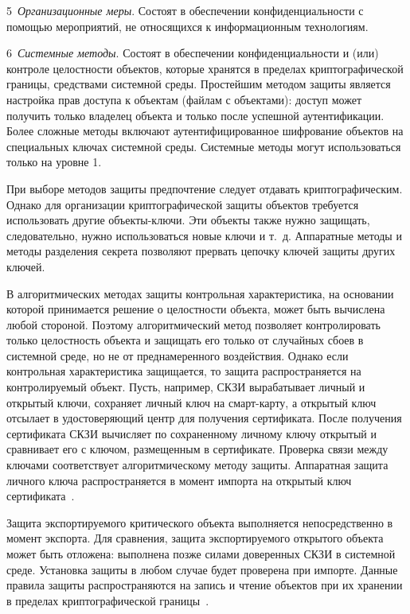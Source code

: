 5~{\it Организационные меры}. 
Состоят в обеспечении конфиденциальности с помощью мероприятий,
не относящихся к информационным технологиям.

6~{\it Системные методы}. 
Состоят в обеспечении конфиденциальности и (или) контроле целостности объектов, 
которые хранятся в пределах криптографической границы, средствами системной 
среды. Простейшим методом защиты является настройка прав доступа к объектам 
(файлам с объектами): доступ может получить только владелец объекта и только 
после успешной аутентификации. Более сложные методы включают 
аутентифицированное шифрование объектов на специальных ключах системной среды.
%
Системные методы могут использоваться только на уровне 1.

При выборе методов защиты предпочтение следует отдавать криптографическим. 
Однако для организации криптографической защиты объектов требуется использовать 
другие объекты-ключи. Эти объекты также нужно защищать, следовательно, нужно 
использоваться новые ключи и т.~д. Аппаратные методы и методы разделения 
секрета позволяют прервать цепочку ключей защиты других ключей.

В алгоритмических методах защиты контрольная характеристика, 
на основании которой принимается решение о целостности объекта, 
может быть вычислена любой стороной. Поэтому алгоритмический метод позволяет 
контролировать только целостность объекта и защищать его только от случайных 
сбоев в системной среде, но не от преднамеренного воздействия. 
%
Однако если контрольная характеристика защищается, то защита распространяется
на контролируемый объект. 
%
Пусть, например, СКЗИ вырабатывает личный и открытый ключи,
сохраняет личный ключ на смарт-карту, 
а открытый ключ отсылает в удостоверяющий центр для получения сертификата. 
%
После получения сертификата СКЗИ вычисляет по сохраненному личному ключу 
открытый и сравнивает его с ключом, размещенным в сертификате.
%
Проверка связи между ключами соответствует алгоритмическому методу защиты.
Аппаратная защита личного ключа распространяется в момент импорта
на открытый ключ сертификата~.

Защита экспортируемого критического объекта выполняется непосредственно в момент
экспорта. Для сравнения, защита экспортируемого открытого объекта может быть
отложена: выполнена позже силами доверенных СКЗИ в системной среде.
%
Установка защиты в любом случае будет проверена при импорте. 
%
Данные правила защиты распространяются на запись и чтение объектов при 
их хранении в пределах криптографической границы~. 

